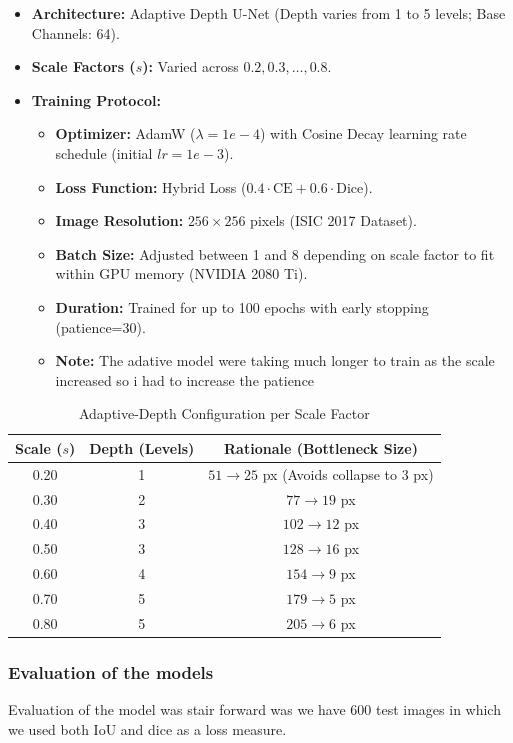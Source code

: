 \begin{itemize} 
    \item \textbf{Architecture:} Adaptive Depth U-Net (Depth varies from 1 to 5 levels; Base Channels: 64). 
    \item \textbf{Scale Factors ($s$):} Varied across ${0.2, 0.3, \dots, 0.8}$. 
    \item \textbf{Training Protocol:} 
        \begin{itemize} 
            \item \textbf{Optimizer:} AdamW ($\lambda=1e-4$) with Cosine Decay learning rate schedule (initial $lr=1e-3$). \item \textbf{Loss Function:} Hybrid Loss ($0.4 \cdot \text{CE} + 0.6 \cdot \text{Dice}$). 
            \item \textbf{Image Resolution:} $256 \times 256$ pixels (ISIC 2017 Dataset). 
            \item \textbf{Batch Size:} Adjusted between 1 and 8 depending on scale factor to fit within GPU memory (NVIDIA 2080 Ti). 
            \item \textbf{Duration:} Trained for up to 100 epochs with early stopping (patience=30).
            \item \textbf{Note:} The adative model were taking much longer to train as the scale increased so i had to increase the patience 
        \end{itemize} 
\end{itemize}

\begin{table}[h!] 
    \centering 
    \caption{Adaptive-Depth Configuration per Scale Factor} \label{tab:adaptive_depth} 
    \begin{tabular}{|c|c|c|} 
    \hline 
    \textbf{Scale ($s$)} & \textbf{Depth (Levels)} & \textbf{Rationale (Bottleneck Size)} \\
    \hline 
    0.20 & 1 & $51 \to 25$ px (Avoids collapse to $3$ px) \\ 
    0.30 & 2 & $77 \to 19$ px \\ 
    0.40 & 3 & $102 \to 12$ px \\
    0.50 & 3 & $128 \to 16$ px \\
    0.60 & 4 & $154 \to 9$ px \\ 
    0.70 & 5 & $179 \to 5$ px \\ 
    0.80 & 5 & $205 \to 6$ px \\ 
    \hline 
    \end{tabular} 
\end{table}



\subsubsection{Evaluation of the models}

Evaluation of the model was stair forward was we have 600 test images in which we used both IoU and dice as a loss measure. 